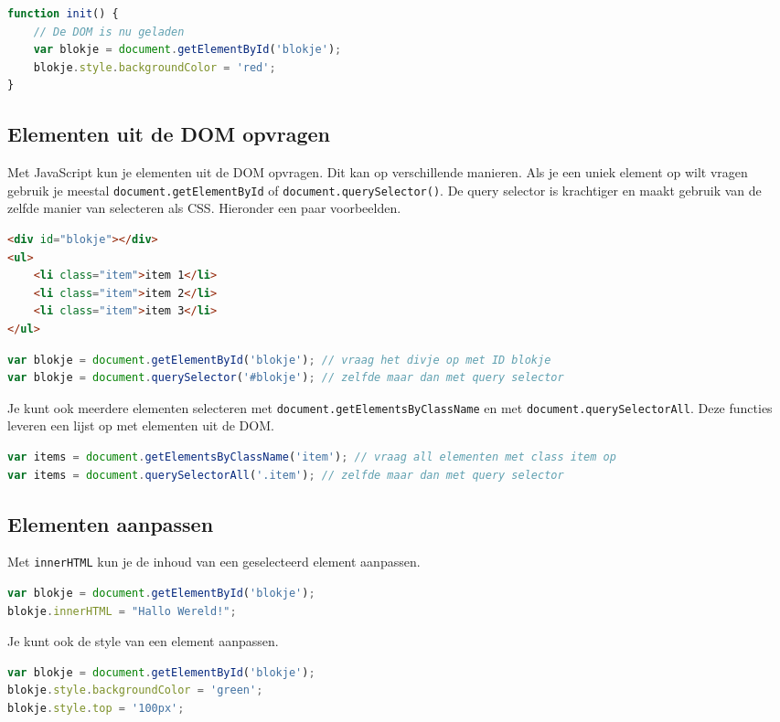 \documentclass[8pt,pagesize,footinclude=false,headinclude=false]{scrartcl}
\begin{document}
\begin{multicols*}{3}
\begin{lstlisting}[language=JavaScript]
function init() {
	// De DOM is nu geladen
	var blokje = document.getElementById('blokje');
	blokje.style.backgroundColor = 'red';
}
\end{lstlisting}

\subsection*{Elementen uit de DOM opvragen}
Met JavaScript kun je elementen uit de DOM opvragen. Dit kan op verschillende manieren. Als je een uniek element op wilt vragen gebruik je meestal \texttt{document.getElementById} of \texttt{document.querySelector()}. De query selector is krachtiger en maakt gebruik van de zelfde manier van selecteren als CSS. Hieronder een paar voorbeelden.

\begin{lstlisting}[language=HTML]
<div id="blokje"></div>
<ul>
	<li class="item">item 1</li>
	<li class="item">item 2</li>
	<li class="item">item 3</li>
</ul>
\end{lstlisting}

\begin{lstlisting}[language=JavaScript]
var blokje = document.getElementById('blokje'); // vraag het divje op met ID blokje
var blokje = document.querySelector('#blokje'); // zelfde maar dan met query selector
\end{lstlisting}

\noindent Je kunt ook meerdere elementen selecteren met \texttt{document.getElementsByClassName} en met \texttt{document.querySelectorAll}. Deze functies leveren een lijst op met elementen uit de DOM.

\begin{lstlisting}[language=JavaScript]
var items = document.getElementsByClassName('item'); // vraag all elementen met class item op
var items = document.querySelectorAll('.item'); // zelfde maar dan met query selector
\end{lstlisting}

\subsection*{Elementen aanpassen}
Met \texttt{innerHTML} kun je de inhoud van een geselecteerd element aanpassen.
\begin{lstlisting}[language=JavaScript]
var blokje = document.getElementById('blokje');
blokje.innerHTML = "Hallo Wereld!";
\end{lstlisting}
\noindent Je kunt ook de style van een element aanpassen.
\begin{lstlisting}[language=JavaScript]
var blokje = document.getElementById('blokje');
blokje.style.backgroundColor = 'green';
blokje.style.top = '100px';
\end{lstlisting}


\end{multicols*}
\end{document}
